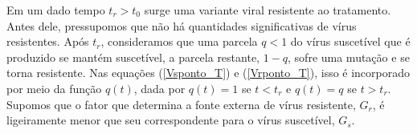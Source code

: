 Em um dado tempo \( t_{ r } > t_{ 0 } \) surge uma variante viral resistente ao tratamento.
Antes dele, pressupomos que não há quantidades significativas de vírus resistentes.
Após \( t_{ r } \), consideramos que uma parcela \( q < 1 \) do vírus suscetível que é produzido se mantém suscetível, a parcela restante, \( 1 - q \), sofre uma mutação e se torna resistente.
Nas equações (\ref{Vsponto_T}) e (\ref{Vrponto_T}), isso é incorporado por meio da função \( q ( t ) \), dada por \( q ( t ) = 1 \) se \( t < t_{ r } \) e \( q ( t ) = q \) se \( t > t_{ r } \).
Supomos que o fator que determina a fonte externa de vírus resistente, \( G_{ r } \), é ligeiramente menor que seu correspondente para o vírus suscetível, \( G_{ s } \).
